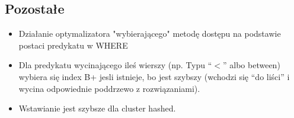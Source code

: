 \documentclass[a4paper,twoside]{article}
\begin{document}
  	\subsection*{Pozostałe}
  	\begin{itemize}
  		\item Działanie optymalizatora "wybierającego" metodę dostępu na podstawie postaci predykatu w WHERE
  		\item Dla predykatu wycinającego ileś wierszy (np. Typu “$ < $” albo between) wybiera się index B+ jesli istnieje, bo jest szybszy (wchodzi się “do liści” i wycina odpowiednie poddrzewo z rozwiązaniami).
  		\item Wstawianie jest szybsze dla cluster hashed.
  	\end{itemize}
  	
  	
  	
  
\end{document}
